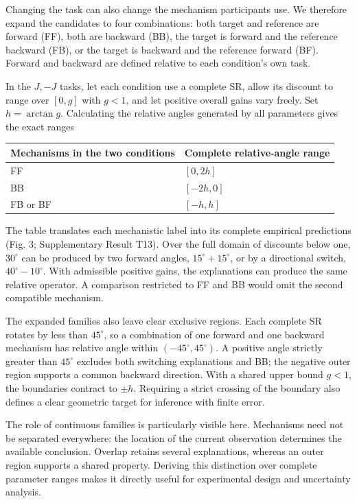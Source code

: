 \documentclass[11pt,a4paper]{article}
\begin{document}
Changing the task can also change the mechanism participants use. We
therefore expand the candidates to four combinations: both target and
reference are forward (FF), both are backward (BB), the target is
forward and the reference backward (FB), or the target is backward and
the reference forward (BF). Forward and backward are defined relative to
each condition's own task.

In the \(J,-J\) tasks, let each condition use a complete SR, allow its
discount to range over \([0,g]\) with \(g<1\), and let positive overall
gains vary freely. Set \(h=\arctan g\). Calculating the relative angles
generated by all parameters gives the exact ranges

\begin{longtable}[]{@{}ll@{}}
\toprule\noalign{}
Mechanisms in the two conditions & Complete relative-angle range \\
\midrule\noalign{}
\endhead
\bottomrule\noalign{}
\endlastfoot
FF & \([0,2h]\) \\
BB & \([-2h,0]\) \\
FB or BF & \([-h,h]\) \\
\end{longtable}

The table translates each mechanistic label into its complete empirical
predictions (Fig. 3; Supplementary Result T13). Over the full domain of
discounts below one, \(30^\circ\) can be produced by two forward angles,
\(15^\circ+15^\circ\), or by a directional switch,
\(40^\circ-10^\circ\). With admissible positive gains, the explanations
can produce the same relative operator. A comparison restricted to FF
and BB would omit the second compatible mechanism.

The expanded families also leave clear exclusive regions. Each complete
SR rotates by less than \(45^\circ\), so a combination of one forward
and one backward mechanism has relative angle within
\((-45^\circ,45^\circ)\). A positive angle strictly greater than
\(45^\circ\) excludes both switching explanations and BB; the negative
outer region supports a common backward direction. With a shared upper
bound \(g<1\), the boundaries contract to \(\pm h\). Requiring a strict
crossing of the boundary also defines a clear geometric target for
inference with finite error.

The role of continuous families is particularly visible here. Mechanisms
need not be separated everywhere: the location of the current
observation determines the available conclusion. Overlap retains several
explanations, whereas an outer region supports a shared property.
Deriving this distinction over complete parameter ranges makes it
directly useful for experimental design and uncertainty analysis.
\end{document}
